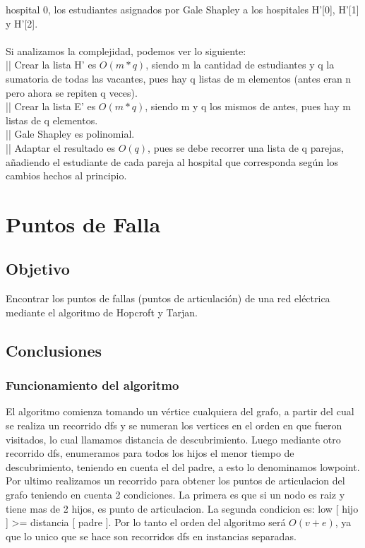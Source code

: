 \documentclass{article}
\begin{document}
                hospital 0, los estudiantes asignados por Gale Shapley a los hospitales H'[0], H'[1] y H'[2]. \\ \\
                Si analizamos la complejidad, podemos ver lo siguiente: \\
                 || Crear la lista H' es $O(m*q)$, siendo m la cantidad de estudiantes y q la sumatoria de todas las vacantes,
                pues hay q listas de m elementos (antes eran n pero ahora se repiten q veces). \\
                 || Crear la lista E' es $O(m*q)$, siendo m y q los mismos de antes, pues hay m listas de q elementos. \\
                 || Gale Shapley es polinomial. \\
                 || Adaptar el resultado es $O(q)$, pues se debe recorrer una lista de q parejas, añadiendo el estudiante
                de cada pareja al hospital que corresponda según los cambios hechos al principio.

    \section{Puntos de Falla}
        \subsection{Objetivo}
            Encontrar los puntos de fallas (puntos de articulación) de una red eléctrica
            mediante el algoritmo de Hopcroft y Tarjan.
        \subsection{Conclusiones}
            \subsubsection{Funcionamiento del algoritmo}
                El algoritmo comienza tomando un vértice cualquiera del grafo, a partir
                del cual se realiza un recorrido dfs y se numeran los vertices en el orden
                en que fueron visitados, lo cual llamamos distancia de descubrimiento.
                Luego mediante otro recorrido dfs, enumeramos para todos los hijos el menor
                tiempo de descubrimiento, teniendo en cuenta el del padre, a esto lo denominamos
                lowpoint. Por ultimo realizamos un recorrido para obtener los puntos de articulacion
                del grafo teniendo en cuenta 2 condiciones. La primera es que si un nodo es raiz
                y tiene mas de 2 hijos, es punto de articulacion. La segunda condicion es:
                low [ hijo ] >= distancia [ padre ].
                Por lo tanto el orden del algoritmo será $O(v+e)$, ya que lo unico que se hace
                son recorridos dfs en instancias separadas.
\end{document}
